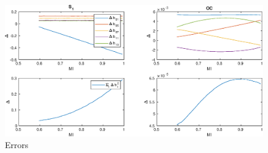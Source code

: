\begin{figure}
    \centering
    \includegraphics[scale=0.6]{img/EX01_3LVL.eps}
    \caption{Errors}
\end{figure}

